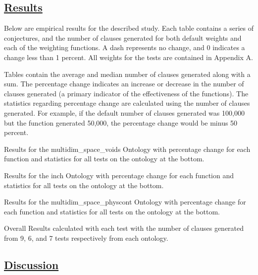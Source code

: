\documentclass{article}
\begin{document}
\subsection{\underline{Results}}
Below are empirical results for the described study. Each table contains a series of conjectures, and the number of clauses generated for both default weights and each of the weighting functions. A dash represents no change, and 0 indicates a change less than 1 percent.  All weights for the tests are contained in Appendix A. 

Tables contain the average and median number of clauses generated along with a sum. The percentage change indicates an increase or decrease in the number of clauses generated (a primary indicator of the effectiveness of the functions). The statistics regarding percentage change are calculated using the number of clauses generated. For example, if the default number of clauses generated was 100,000 but the function generated 50,000, the percentage change would be minus 50 percent. 
\vspace{1cm}
\begin{table}[h]
\centering
{}
\caption{Results for the multidim\_space\_voids Ontology with percentage change for each function and statistics for all tests on the ontology at the bottom.}
\end{table}

\begin{table}[h]
\centering
{}
\caption{Results for the inch Ontology with percentage change for each function and statistics for all tests on the ontology at the bottom.}
\end{table}

\begin{table}[h]
\centering
{}
\caption{Results for the multidim\_space\_physcont Ontology with percentage change for each function and statistics for all tests on the ontology at the bottom.}
\end{table}

\begin{table}[h]
\centering
{}
\caption{Overall Results calculated with each test with the number of clauses generated from 9, 6,  and 7 tests respectively from each ontology. }
\end{table}


\newpage
\subsection{\underline{Discussion}}
\end{document}
